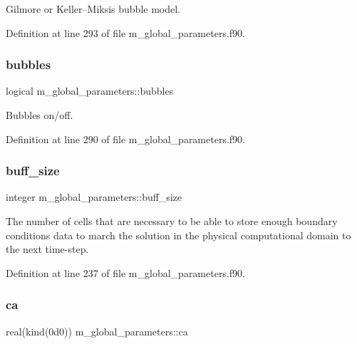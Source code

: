 Gilmore or Keller--Miksis bubble model. 



Definition at line 293 of file m\+\_\+global\+\_\+parameters.\+f90.

\mbox{\label{namespacem__global__parameters_a4a22ed160838f8fbe6bd506f334b8815}} 
\subsubsection{\texorpdfstring{bubbles}{bubbles}}
{\footnotesize\ttfamily logical m\+\_\+global\+\_\+parameters\+::bubbles}



Bubbles on/off. 



Definition at line 290 of file m\+\_\+global\+\_\+parameters.\+f90.

\mbox{\label{namespacem__global__parameters_a6e342ae3eb66f89e0eeb94e11aa42d92}} 
\subsubsection{\texorpdfstring{buff\+\_\+size}{buff\_size}}
{\footnotesize\ttfamily integer m\+\_\+global\+\_\+parameters\+::buff\+\_\+size}



The number of cells that are necessary to be able to store enough boundary conditions data to march the solution in the physical computational domain to the next time-\/step. 



Definition at line 237 of file m\+\_\+global\+\_\+parameters.\+f90.

\mbox{\label{namespacem__global__parameters_a1fcd6cc13ad7f604ef81708716a1feac}} 
\subsubsection{\texorpdfstring{ca}{ca}}
{\footnotesize\ttfamily real(kind(0d0)) m\+\_\+global\+\_\+parameters\+::ca}



